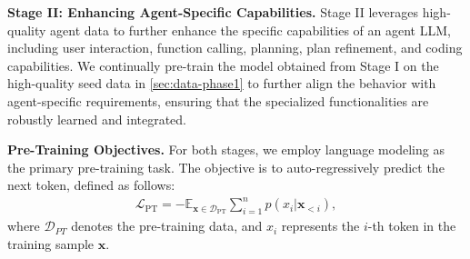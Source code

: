 \noindent \textbf{Stage II: Enhancing Agent-Specific Capabilities.}
Stage II leverages high-quality agent data to further enhance the specific capabilities of an agent LLM, including user interaction, function calling, planning, plan refinement, and coding capabilities. We continually pre-train the model obtained from Stage I on the high-quality seed data in \cref{sec:data-phase1} to further align the behavior with agent-specific requirements, ensuring that the specialized functionalities are robustly learned and integrated.

\noindent \textbf{Pre-Training Objectives.} For both stages, we employ language modeling as the primary pre-training task. 
The objective is to auto-regressively predict the next token, defined as follows:
\begin{equation*}
    \begin{aligned}
        \mathcal{L}_{\text{PT}}=-\mathbb{E}_{\mathbf{x}\in\mathcal{D}_{\text{PT}}}\sum_{i=1}^np(x_i|\mathbf{x}_{<i}),
    \end{aligned}
\end{equation*}
where $\mathcal{D}_{PT}$ denotes the pre-training data, and $x_i$ represents the $i$-th token in the training sample $\mathbf{x}$.


